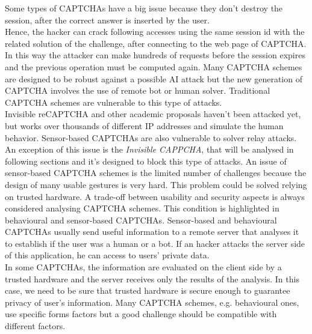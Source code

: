 \begin{itemize}
{Some types of CAPTCHAs have a big issue because they don't destroy the session, after the correct answer is inserted by the user\cite{text_audio}.\\
Hence, the hacker can crack following accesses using the same session id with the related solution of the challenge, after connecting to the web page of CAPTCHA. In this way the attacker can make hundreds of requests before the session expires and the previous operation must be computed again.}
{Many CAPTCHA schemes are designed to be robust against a possible AI attack but the new generation of CAPTCHA involves the use of remote bot or human solver. Traditional CAPTCHA schemes are vulnerable to this type of attacks.\\
Invisible reCAPTCHA and other academic proposals haven't been attacked yet, but works over thousands of different IP addresses and simulate the human behavior. Sensor-based CAPTCHAs are also vulnerable to solver relay attacks. An exception of this issue is the \textit{Invisible CAPPCHA}, that will be analysed in following sections and it's designed to block this type of attacks.
}
{An issue of sensor-based CAPTCHA schemes is the limited number of challenges because the design of many usable gestures is very hard. This problem could be solved
relying on trusted hardware.}
{A trade-off between usability and security aspects is always considered analysing CAPTCHA schemes. This condition is highlighted in behavioural and sensor-based CAPTCHAs.}
{Sensor-based and behavioural CAPTCHAs usually send useful information to a remote server that analyses it to establish if the user was a human or a bot. If an hacker attacks the server side of this application, he can access to users' private data.\\
In some CAPTCHAs, the information are evaluated on the client side by a trusted hardware and the server receives only the results of the analysis. In this case, we need to be sure that trusted hardware is secure enough to guarantee privacy of user's information.
}
{Many CAPTCHA schemes, e.g. behavioural ones, use specific forms factors but a good challenge should be compatible with different factors.}
\end{itemize}

